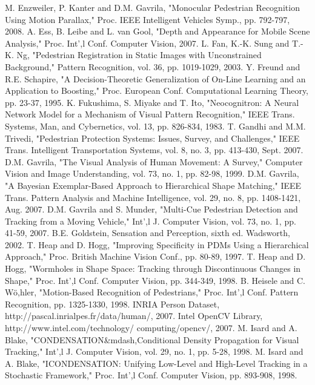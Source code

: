 \documentclass[10pt,letterpaper,journal,compsoc]{IEEEtran}
\begin{document}
\begin{thebibliography}{99}
M. Enzweiler, P. Kanter and D.M. Gavrila, "Monocular Pedestrian Recognition Using Motion Parallax," Proc. IEEE Intelligent Vehicles Symp., pp. 792-797, 2008. 
A. Ess, B. Leibe and L. van Gool, "Depth and Appearance for Mobile Scene Analysis," Proc. Int',l Conf. Computer Vision, 2007. 
L. Fan, K.-K. Sung and T.-K. Ng, "Pedestrian Registration in Static Images with Unconstrained Background," Pattern Recognition, vol. 36, pp. 1019-1029, 2003. 
Y. Freund and R.E. Schapire, "A Decision-Theoretic Generalization of On-Line Learning and an Application to Boosting," Proc. European Conf. Computational Learning Theory, pp. 23-37, 1995. 
K. Fukushima, S. Miyake and T. Ito, "Neocognitron: A Neural Network Model for a Mechanism of Visual Pattern Recognition," IEEE Trans. Systems, Man, and Cybernetics, vol. 13, pp. 826-834, 1983. 
T. Gandhi and M.M. Trivedi, "Pedestrian Protection Systems: Issues, Survey, and Challenges," IEEE Trans. Intelligent Transportation Systems, vol. 8, no. 3, pp. 413-430, Sept. 2007. 
D.M. Gavrila, "The Visual Analysis of Human Movement: A Survey," Computer Vision and Image Understanding, vol. 73, no. 1, pp. 82-98, 1999. 
D.M. Gavrila, "A Bayesian Exemplar-Based Approach to Hierarchical Shape Matching," IEEE Trans. Pattern Analysis and Machine Intelligence, vol. 29, no. 8, pp. 1408-1421, Aug. 2007. 
D.M. Gavrila and S. Munder, "Multi-Cue Pedestrian Detection and Tracking from a Moving Vehicle," Int',l J. Computer Vision, vol. 73, no. 1, pp. 41-59, 2007. 
B.E. Goldstein, Sensation and Perception, sixth ed. Wadsworth, 2002. 
T. Heap and D. Hogg, "Improving Specificity in PDMs Using a Hierarchical Approach," Proc. British Machine Vision Conf., pp. 80-89, 1997. 
T. Heap and D. Hogg, "Wormholes in Shape Space: Tracking through Discontinuous Changes in Shape," Proc. Int',l Conf. Computer Vision, pp. 344-349, 1998. 
B. Heisele and C. Wö,hler, "Motion-Based Recognition of Pedestrians," Proc. Int',l Conf. Pattern Recognition, pp. 1325-1330, 1998. 
INRIA Person Dataset, http://pascal.inrialpes.fr/data/human/, 2007. 
Intel OpenCV Library, http://www.intel.com/technology/ computing/opencv/, 2007. 
M. Isard and A. Blake, "CONDENSATION\&mdash,Conditional Density Propagation for Visual Tracking," Int',l J. Computer Vision, vol. 29, no. 1, pp. 5-28, 1998. 
M. Isard and A. Blake, "ICONDENSATION: Unifying Low-Level and High-Level Tracking in a Stochastic Framework," Proc. Int',l Conf. Computer Vision, pp. 893-908, 1998. 

\end{thebibliography}
\end{document}
